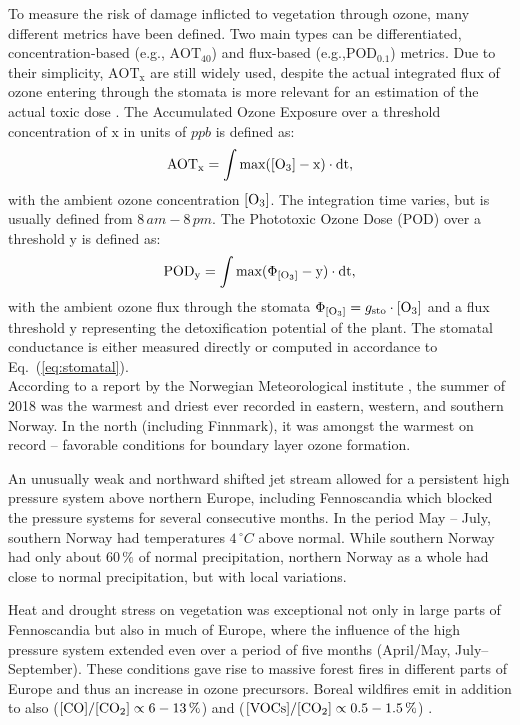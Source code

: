 \documentclass[bg, manuscript]{copernicus}
\begin{document}
To measure the risk of damage inflicted to vegetation through ozone, many different metrics have been defined. Two main types can be differentiated, concentration-based (e.g., $\mathrm{AOT_{40}}$) and flux-based (e.g.,$\mathrm{POD_{0.1}}$) metrics. Due to their simplicity, $\mathrm{AOT_{x}}$ are still widely used, despite the actual integrated flux of ozone entering through the stomata is more relevant for an estimation of the actual toxic dose \citep{ICP:MappingManual2017}. 
The Accumulated Ozone Exposure over a threshold concentration of $\mathrm{x}$ in units of $\unit{ppb}$ is defined as:
\begin{equation}
  \mathrm{AOT_x} = \int{\mathrm{max(\chem{[O_3]}-x)}\cdot \mathrm{dt}},
  \label{eq:aot}
\end{equation}
with the ambient ozone concentration $\chem{[O_3]}$. The integration time varies, but is usually defined from $8\,\unit{am}-8\,\unit{pm}$.
The Phototoxic Ozone Dose (POD) over a threshold y is defined as:
\begin{equation}
  \mathrm{POD_y} = \int{\mathrm{max(\Phi_\chem{[O_3]}-y)}\cdot \mathrm{dt}},
  \label{eq:pod}
\end{equation}
with the ambient ozone flux through the stomata $\Phi_\chem{[O_3]} = g_\mathrm{sto} \cdot \chem{[O_3]}$ and a flux threshold $\mathrm{y}$ representing the detoxification potential of the plant. The stomatal conductance is either measured directly or computed in accordance to Eq.~(\ref{eq:stomatal}).\\


According to a report by the Norwegian Meteorological institute \citep{MetNOR2019}, the summer of 2018 was the warmest and driest ever recorded in eastern, western, and southern Norway. In the north (including Finnmark), it was amongst the warmest on record -- favorable conditions for boundary layer ozone formation.

An unusually weak and northward shifted jet stream allowed for a persistent high pressure system above northern Europe, including Fennoscandia which blocked the pressure systems for several consecutive months. In the period May -- July, southern Norway had temperatures $4\,\unit{^\circ C}$ above normal. While southern Norway had only about $60\,\unit{\%}$ of normal precipitation, northern Norway as a whole had close to normal precipitation, but with local variations.

Heat and drought stress on vegetation was exceptional not only in large parts of Fennoscandia but also in much of Europe, where the influence of the high pressure system extended even over a period of five months (April/May, July--September). These conditions gave rise to massive forest fires in different parts of Europe and thus an increase in ozone precursors. Boreal wildfires emit in addition to  also  ($\chem{[CO]}/\chem{[CO_2]} \propto 6-13\,\unit{\%}$) and  ($\chem{[VOCs]}/\chem{[CO_2]} \propto 0.5-1.5\,\unit{\%}$) \citep{AE:Cofer1990}.
\end{document}
